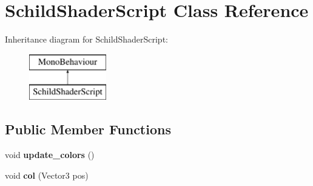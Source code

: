 \hypertarget{class_schild_shader_script}{}\section{Schild\+Shader\+Script Class Reference}
\label{class_schild_shader_script}
Inheritance diagram for Schild\+Shader\+Script\+:\begin{figure}[H]
\begin{center}
\leavevmode
\includegraphics[height=2.000000cm]{class_schild_shader_script}
\end{center}
\end{figure}
\subsection*{Public Member Functions}
\begin{DoxyCompactItemize}
\item 
\mbox{\label{class_schild_shader_script_ada7e33cd5e79283940406fcb0ad496ae}} 
void {\bfseries update\+\_\+colors} ()
\item 
\mbox{\label{class_schild_shader_script_a7fbf9059b3dd81f8960929ffb991711c}} 
void {\bfseries col} (Vector3 pos)
\end{DoxyCompactItemize}
